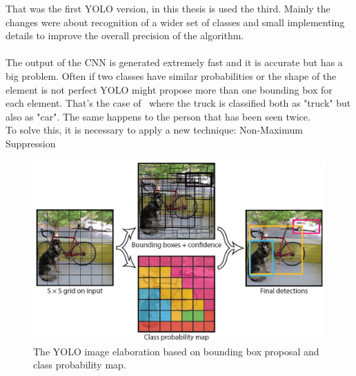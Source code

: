 That was the first YOLO version, in this thesis is used the third\cite{yoloV3}. Mainly the changes were about recognition of a wider set of classes and small implementing details to improve the overall precision of the algorithm.\\
\\
The output of the CNN is generated extremely fast and it is accurate but has a big problem. Often if two classes have similar probabilities or the shape of the element is not perfect YOLO might propose more than one bounding box for each element. That's the case of~ where the truck is classified both as "truck" but also as "car". The same happens to the person that has been seen twice.\\
To solve this, it is necessary to apply a new technique: Non-Maximum Suppression

\begin{figure}[!h]
	\centering
	\includegraphics[width=0.8\linewidth]{images/detection/howItWorks_yolo}
	\caption{The YOLO image elaboration based on bounding box proposal and class probability map.}
	\label{fig:howItWorks_yolo}
\end{figure}

